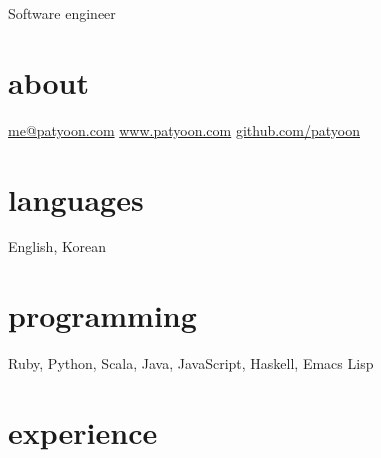 \documentclass[]{patyoon-cv}
\begin{document}
{Software engineer}

\begin{aside}
  \section{about}
  \href{mailto:me@patyoon.com}{me@patyoon.com}
  \href{https://patyoon.com}{www.patyoon.com}
  \href{http://github.com/patyoon}{github.com/patyoon}
  \section{languages}
  English, Korean
  \section{programming}
  Ruby,
  Python,
  Scala,
  Java,
  JavaScript,
  Haskell,
  Emacs Lisp
\end{aside}

\section{experience}
\end{document}
